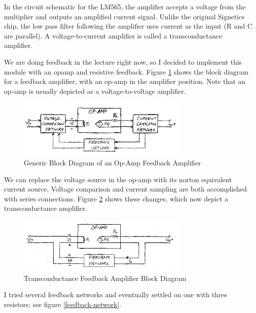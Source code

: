 \documentclass[titlepage, letterpaper, 10.5pt]{article}
\begin{document}
In the circuit schematic for the LM565, the amplifier accepts a voltage from the multiplier and outputs an amplified current signal.
Unlike the original Signetics chip, the low pass filter following the amplifier uses current as the input (R and C are parallel).
A voltage-to-current amplifier is called a transconductance amplifier.

We are doing feedback in the lecture right now, so I decided to implement this module with an opamp and resistive feedback.
Figure \ref{feedback-voltage-amp} shows the block diagram for a feedback amplifier, with an op-amp in the amplifier position.
Note that an op-amp is usually depicted as a voltage-to-voltage amplifier.

\begin{figure}[ht]
	\centering
	\includegraphics[width=0.75\textwidth]{diagrams/feedback-voltage-amp}
	\caption{Generic Block Diagram of an Op-Amp Feedback Amplifier}
	\label{feedback-voltage-amp}
\end{figure}

We can replace the voltage source in the op-amp with its norton equivalent current source.
Voltage comparison and current sampling are both accomplished with series connections.
Figure \ref{feedback-transconductance-amp} shows these changes, which now depict a transconductance amplifier.

\clearpage

\begin{figure}[ht]
	\centering
	\includegraphics[width=0.75\textwidth]{diagrams/feedback-transconductance-amp}
	\caption{Transconductance Feedback Amplifier Block Diagram}
	\label{feedback-transconductance-amp}
\end{figure}

I tried several feedback networks and eventually settled on one with three resistors; see figure \ref{feedback-network}.
\end{document}
